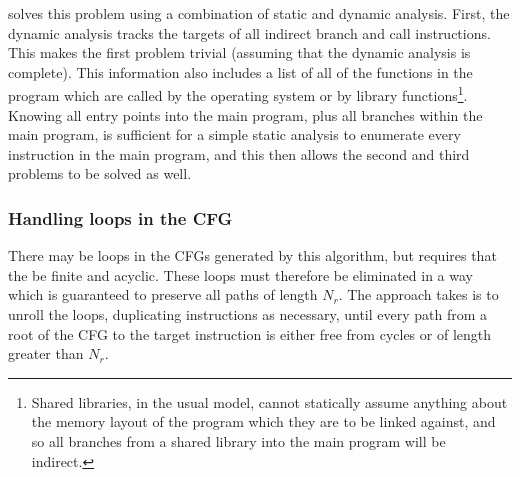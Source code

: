 {\Implementation} solves this problem using a combination of static
and dynamic analysis.  First, the dynamic analysis tracks the targets
of all indirect branch and call instructions.  This makes the first
problem trivial (assuming that the dynamic analysis is complete).
This information also includes a list of all of the functions in the
program which are called by the operating system or by library
functions\footnote{Shared libraries, in the usual model, cannot
  statically assume anything about the memory layout of the program
  which they are to be linked against, and so all branches from a
  shared library into the main program will be indirect.}.  Knowing
all entry points into the main program, plus all branches within the
main program, is sufficient for a simple static analysis to enumerate
every instruction in the main program, and this then allows the second
and third problems to be solved as well.


\subsubsection{Handling loops in the CFG}

There may be loops in the CFGs generated by this algorithm, but
{\technique} requires that the {\StateMachines} be finite and acyclic.
These loops must therefore be eliminated in a way which is guaranteed
to preserve all paths of length $N_r$.  The approach {\technique}
takes is to unroll the loops, duplicating instructions as necessary,
until every path from a root of the CFG to the target instruction is
either free from cycles or of length greater than $N_r$.

